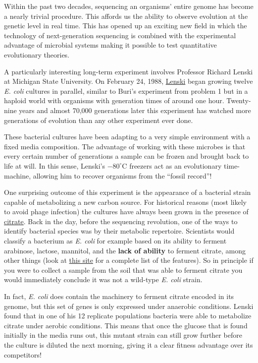\documentclass[12pt]{article}    %
\begin{document}
Within the past two decades, sequencing an organisms' entire genome has become a
nearly trivial procedure. This affords us the ability to observe evolution at
the genetic level in real time. This has opened up an exciting new field in
which the technology of next-generation sequencing is combined with the
experimental advantage of microbial systems making it possible to test
quantitative evolutionary theories.

A particularly interesting long-term experiment involves Professor
Richard Lenski at Michigan
State University. On February 24, 1988,
\href{http://myxo.css.msu.edu/index.html}{Lenski} began growing twelve
\textit{E. coli} cultures in parallel, similar to Buri's experiment from problem
1 but in a haploid world with organisms with generation times of around one
hour. Twenty-nine years and almost 70,000 generations later this experiment has watched more generations of evolution than any other experiment ever done.


These bacterial cultures have been adapting to a very simple environment with a fixed
media composition. The advantage of working with these microbes is that every
certain number of generations a sample can be frozen and brought back to life at
will. In this sense, Lenski's $-80^\circ$C freezers act as an evolutionary
time-machine, allowing him to recover organisms from the ``fossil record''!

One surprising outcome of this experiment is the appearance of a bacterial
strain capable of metabolizing a new carbon source. For historical reasons (most
likely to avoid phage infection) the cultures have always been grown in the
presence of \href{https://en.wikipedia.org/wiki/Citric_acid}{citrate}. Back in
the day, before the sequencing revolution, one of the ways to identify bacterial
species was by their metabolic repertoire. Scientists would classify a
bacterium as \textit{E. coli} for example based on its ability to ferment
arabinose, lactose, mannitol, and the \textbf{lack of ability} to ferment
citrate, among other things
(look at
\href{http://www.microbiologyinfo.com/biochemical-test-and-identification-of-e-coli/}{this
site} for a complete list of the features). So in principle if you were to
collect a sample from the soil that was able to ferment citrate you would
immediately conclude it was not a wild-type \textit{E. coli} strain.

In fact,  \textit{E. coli} does contain the machinery to ferment citrate
encoded in its genome, but this set of genes is only expressed under anaerobic
conditions. Lenski found that in one of his 12 replicate populations bacteria
were able to metabolize citrate under aerobic conditions. This means that once
the glucose that is found initially in the media runs out, this mutant strain
can still grow further before the culture is diluted the next morning, giving it
a clear fitness advantage over its competitors!
\end{document}
